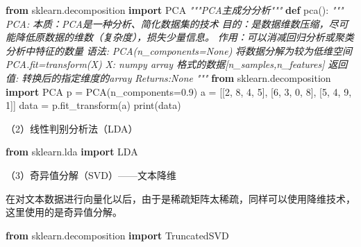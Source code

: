 \documentclass[
]{article}
\newenvironment{Shaded}{}{}
\newcommand{\BuiltInTok}[1]{\textcolor[rgb]{0.00,0.50,0.00}{#1}}
\newcommand{\CommentTok}[1]{\textcolor[rgb]{0.38,0.63,0.69}{\textit{#1}}}
\newcommand{\DecValTok}[1]{\textcolor[rgb]{0.25,0.63,0.44}{#1}}
\newcommand{\FloatTok}[1]{\textcolor[rgb]{0.25,0.63,0.44}{#1}}
\newcommand{\ImportTok}[1]{\textcolor[rgb]{0.00,0.50,0.00}{\textbf{#1}}}
\newcommand{\KeywordTok}[1]{\textcolor[rgb]{0.00,0.44,0.13}{\textbf{#1}}}
\newcommand{\NormalTok}[1]{#1}
\newcommand{\OperatorTok}[1]{\textcolor[rgb]{0.40,0.40,0.40}{#1}}
\begin{document}
\begin{Shaded}
\begin{Highlighting}[]
\ImportTok{from}\NormalTok{ sklearn.decomposition }\ImportTok{import}\NormalTok{ PCA}
\CommentTok{"""PCA主成分分析"""}
\KeywordTok{def}\NormalTok{ pca():}
    \CommentTok{"""}
\CommentTok{        PCA:}
\CommentTok{            本质：PCA是一种分析、简化数据集的技术}
\CommentTok{            目的：是数据维数压缩，尽可能降低原数据的维数（复杂度），损失少量信息。}
\CommentTok{            作用：可以消减回归分析或聚类分析中特征的数量}
\CommentTok{        语法:}
\CommentTok{            PCA(n\_components=None)}
\CommentTok{                将数据分解为较为低维空间}
\CommentTok{                PCA.fit=transform(X)}
\CommentTok{                    X: numpy array 格式的数据[n\_samples,n\_features]}
\CommentTok{                    返回值: 转换后的指定维度的array}
\CommentTok{    Returns:None}
\CommentTok{    """}
    \ImportTok{from}\NormalTok{ sklearn.decomposition }\ImportTok{import}\NormalTok{ PCA}
\NormalTok{    p }\OperatorTok{=}\NormalTok{ PCA(n\_components}\OperatorTok{=}\FloatTok{0.9}\NormalTok{)}
\NormalTok{    a }\OperatorTok{=}\NormalTok{ [[}\DecValTok{2}\NormalTok{, }\DecValTok{8}\NormalTok{, }\DecValTok{4}\NormalTok{, }\DecValTok{5}\NormalTok{],}
\NormalTok{         [}\DecValTok{6}\NormalTok{, }\DecValTok{3}\NormalTok{, }\DecValTok{0}\NormalTok{, }\DecValTok{8}\NormalTok{],}
\NormalTok{         [}\DecValTok{5}\NormalTok{, }\DecValTok{4}\NormalTok{, }\DecValTok{9}\NormalTok{, }\DecValTok{1}\NormalTok{]]}
\NormalTok{    data }\OperatorTok{=}\NormalTok{ p.fit\_transform(a)}
    \BuiltInTok{print}\NormalTok{(data)}
\end{Highlighting}
\end{Shaded}

（2）线性判别分析法（LDA）

\begin{Shaded}
\begin{Highlighting}[]
\ImportTok{from}\NormalTok{ sklearn.lda }\ImportTok{import}\NormalTok{ LDA}
\end{Highlighting}
\end{Shaded}

（3）奇异值分解（SVD）------文本降维

在对文本数据进行向量化以后，由于是稀疏矩阵太稀疏，同样可以使用降维技术，这里使用的是奇异值分解。

\begin{Shaded}
\begin{Highlighting}[]
\ImportTok{from}\NormalTok{ sklearn.decomposition }\ImportTok{import}\NormalTok{ TruncatedSVD}
\end{Highlighting}
\end{Shaded}
\end{document}
